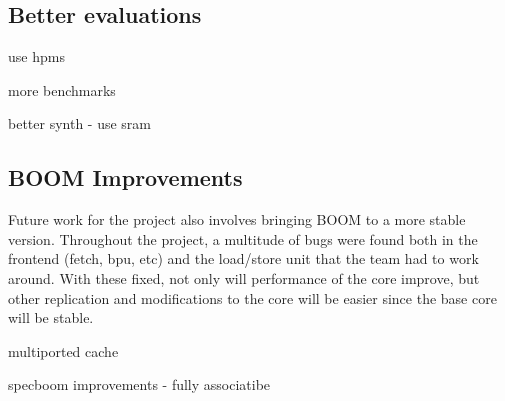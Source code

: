 \subsection{Better evaluations}
use hpms

more benchmarks

better synth - use sram

\subsection{BOOM Improvements}

Future work for the project also involves bringing BOOM to a more stable version. Throughout
the project, a multitude of bugs were found both in the frontend (fetch, bpu, etc) and the 
load/store unit that the team had to work around. With these fixed, not only will performance
of the core improve, but other replication and modifications to the core will be easier since
the base core will be stable.

multiported cache

specboom improvements - fully associatibe

